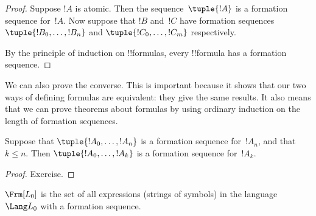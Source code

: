 \documentclass[../../../include/open-logic-section]{subfiles}
\begin{document}
\begin{proof}
Suppose $!A$ is atomic. Then the sequence~$\tuple{!A}$ is a
formation sequence for~$!A$.
%
Now suppose that $!B$ and~$!C$ have formation sequences
$\tuple{!B_0,\dotsc,!B_n}$ and $\tuple{!C_0,\dotsc,!C_m}$
respectively.
%
\begin{enumerate}
\end{enumerate}
By the principle of induction on !!{formula}s,
every !!{formula} has a formation sequence.
\end{proof}

We can also prove the converse. This is important because it shows
that our two ways of defining formulas are equivalent: they give
the same results. It also means that we can prove theorems about
formulas by using ordinary induction on the length of formation
sequences.

\begin{lem}
Suppose that $\tuple{!A_0,\dotsc,!A_n}$ is a formation sequence
for~$!A_n$, and that $k \leq n$. Then $\tuple{!A_0,\dotsc,!A_k}$
is a formation sequence for~$!A_k$.
\end{lem}

\begin{proof}
Exercise.
\end{proof}

\begin{thm}
$\Frm[L_0]$ is the set of all expressions (strings of symbols)
in the language~$\Lang L_0$ with a formation sequence.
\end{thm}
\end{document}
